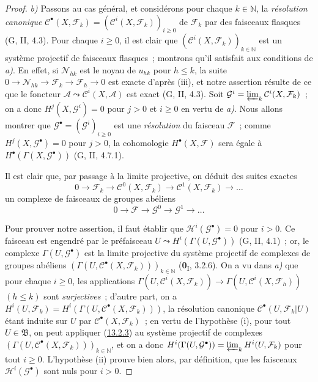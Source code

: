 \begin{proof}
\emph{b)} Passons au cas général, et considérons pour chaque $k\in\mathbb N$,
la \emph{résolution canonique}
$\mathcal C^\bullet(X,\mathcal F_k)
=(\mathcal C^i(X,\mathcal F_k))_{i\geq0}$ de $\mathcal F_k$ par des
faisceaux flasques (G, II, 4.3). Pour chaque $i\geq0$, il est clair que
$(\mathcal C^i(X,\mathcal F_k))_{k\in\mathbb N}$ est un système projectif
de faisceaux flasques~; montrons
qu'il satisfait aux conditions de
\emph{a)}. En effet, si $\mathcal N_{hk}$ est le noyau de $u_{hk}$ pour $h\leq k$, la
suite
$0\to\mathcal N_{hk}\to\mathcal F_k\to\mathcal F_h\to0$
est exacte d'après (iii), et notre assertion résulte de ce que le foncteur
$\mathcal A\leadsto\mathcal C^i(X,\mathcal A)$ est exact (G, II, 4.3).
Soit
$\mathcal G^i=\varprojlim_k\mathcal C^i(X,\mathcal F_k)$~; on a donc
$H^j(X,\mathcal G^i)=0$ pour $j>0$ et $i\geq0$ en vertu de \emph{a)}. Nous
allons montrer que $\mathcal G^\bullet=(\mathcal G^i)_{i\geq0}$ est une
\emph{résolution} du faisceau $\mathcal F$~; comme
$H^j(X,\mathcal G^\bullet)=0$ pour $j>0$, la cohomologie $H^\bullet(X,\mathcal F)$
sera égale à $H^\bullet(\Gamma(X,\mathcal G^\bullet))$ (G, II, 4.7.1).

Il est clair que, par passage à la limite projective, on déduit des suites
exactes
\[
0\longrightarrow\mathcal F_k
\longrightarrow\mathcal C^0(X,\mathcal F_k)
\longrightarrow\mathcal C^1(X,\mathcal F_k)\longrightarrow\ldots
\]
un complexe de faisceaux de groupes abéliens
\[
0\longrightarrow\mathcal F\longrightarrow\mathcal G^0
\longrightarrow\mathcal G^1\longrightarrow\ldots
\]

Pour prouver notre assertion, il faut établir que
$\mathcal H^i(\mathcal G^\bullet)=0$ pour $i>0$. Ce faisceau est engendré
par le préfaisceau
$U\leadsto H^i(\Gamma(U,\mathcal G^\bullet))$ (G, II, 4.1)~; or, le complexe
$\Gamma(U,\mathcal G^\bullet)$ est la limite projective du système
projectif de complexes de groupes abéliens
$(\Gamma(U,\mathcal C^\bullet(X,\mathcal F_k)))_{k\in\mathbb N}$
(\textbf{0}\textsubscript{I}, 3.2.6). On a vu dans \emph{a)} que pour chaque
$i\geq0$, les applications
$\Gamma(U,\mathcal C^i(X,\mathcal F_k))\to
\Gamma(U,\mathcal C^i(X,\mathcal F_h))$ $(h\leq k)$ sont \emph{surjectives}~;
d'autre part, on a
$H^i(U,\mathcal F_k)=
H^i(\Gamma(U,\mathcal C^\bullet(X,\mathcal F_k)))$, la résolution canonique
$\mathcal C^\bullet(U,\mathcal F_k|U)$ étant induite sur $U$ par
$\mathcal C^\bullet(X,\mathcal F_k)$~; en vertu de l'hypothèse (i), pour
tout $U\in\mathfrak B$, on peut appliquer
(\hyperref[0.13.2.3-fr]{13.2.3}) au système projectif de complexes
$(\Gamma(U,\mathcal C^\bullet(X,\mathcal F_k)))_{k\in\mathbb N}$, et on a
donc
$H^i(\Gamma(U,\mathcal G^\bullet))=\varprojlim_k H^i(U,\mathcal F_k)$ pour tout $i\geq0$. L'hypothèse (ii) prouve bien alors, par définition, que les faisceaux
$\mathcal H^i(\mathcal G^\bullet)$ sont nuls pour $i>0$.


\end{proof}
